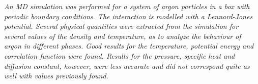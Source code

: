 \emph{An MD simulation was performed for a system of argon particles in a box with periodic boundary conditions. The interaction is modelled with a Lennard-Jones potential. Several physical quantities were extracted from the simulation for several values of the density and temperature, as to analyze the behaviour of argon in different phases. Good results for the temperature, potential energy and correlation function were found. Results for the pressure, specific heat and diffusion constant, however, were less accurate and did not correspond quite as well with values previously found.}